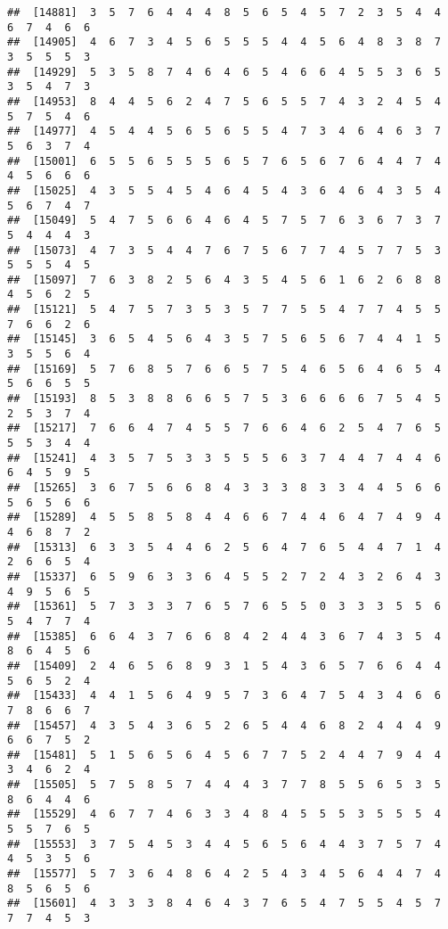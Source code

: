 \documentclass[
]{book}
\begin{document}
\begin{verbatim}
##  [14881]  3  5  7  6  4  4  4  8  5  6  5  4  5  7  2  3  5  4  4  6  7  4  6  6
##  [14905]  4  6  7  3  4  5  6  5  5  5  4  4  5  6  4  8  3  8  7  3  5  5  5  3
##  [14929]  5  3  5  8  7  4  6  4  6  5  4  6  6  4  5  5  3  6  5  3  5  4  7  3
##  [14953]  8  4  4  5  6  2  4  7  5  6  5  5  7  4  3  2  4  5  4  5  7  5  4  6
##  [14977]  4  5  4  4  5  6  5  6  5  5  4  7  3  4  6  4  6  3  7  5  6  3  7  4
##  [15001]  6  5  5  6  5  5  5  6  5  7  6  5  6  7  6  4  4  7  4  4  5  6  6  6
##  [15025]  4  3  5  5  4  5  4  6  4  5  4  3  6  4  6  4  3  5  4  5  6  7  4  7
##  [15049]  5  4  7  5  6  6  4  6  4  5  7  5  7  6  3  6  7  3  7  5  4  4  4  3
##  [15073]  4  7  3  5  4  4  7  6  7  5  6  7  7  4  5  7  7  5  3  5  5  5  4  5
##  [15097]  7  6  3  8  2  5  6  4  3  5  4  5  6  1  6  2  6  8  8  4  5  6  2  5
##  [15121]  5  4  7  5  7  3  5  3  5  7  7  5  5  4  7  7  4  5  5  7  6  6  2  6
##  [15145]  3  6  5  4  5  6  4  3  5  7  5  6  5  6  7  4  4  1  5  3  5  5  6  4
##  [15169]  5  7  6  8  5  7  6  6  5  7  5  4  6  5  6  4  6  5  4  5  6  6  5  5
##  [15193]  8  5  3  8  8  6  6  5  7  5  3  6  6  6  6  7  5  4  5  2  5  3  7  4
##  [15217]  7  6  6  4  7  4  5  5  7  6  6  4  6  2  5  4  7  6  5  5  5  3  4  4
##  [15241]  4  3  5  7  5  3  3  5  5  5  6  3  7  4  4  7  4  4  6  6  4  5  9  5
##  [15265]  3  6  7  5  6  6  8  4  3  3  3  8  3  3  4  4  5  6  6  5  6  5  6  6
##  [15289]  4  5  5  8  5  8  4  4  6  6  7  4  4  6  4  7  4  9  4  4  6  8  7  2
##  [15313]  6  3  3  5  4  4  6  2  5  6  4  7  6  5  4  4  7  1  4  2  6  6  5  4
##  [15337]  6  5  9  6  3  3  6  4  5  5  2  7  2  4  3  2  6  4  3  4  9  5  6  5
##  [15361]  5  7  3  3  3  7  6  5  7  6  5  5  0  3  3  3  5  5  6  5  4  7  7  4
##  [15385]  6  6  4  3  7  6  6  8  4  2  4  4  3  6  7  4  3  5  4  8  6  4  5  6
##  [15409]  2  4  6  5  6  8  9  3  1  5  4  3  6  5  7  6  6  4  4  5  6  5  2  4
##  [15433]  4  4  1  5  6  4  9  5  7  3  6  4  7  5  4  3  4  6  6  7  8  6  6  7
##  [15457]  4  3  5  4  3  6  5  2  6  5  4  4  6  8  2  4  4  4  9  6  6  7  5  2
##  [15481]  5  1  5  6  5  6  4  5  6  7  7  5  2  4  4  7  9  4  4  3  4  6  2  4
##  [15505]  5  7  5  8  5  7  4  4  4  3  7  7  8  5  5  6  5  3  5  8  6  4  4  6
##  [15529]  4  6  7  7  4  6  3  3  4  8  4  5  5  5  3  5  5  5  4  5  5  7  6  5
##  [15553]  3  7  5  4  5  3  4  4  5  6  5  6  4  4  3  7  5  7  4  4  5  3  5  6
##  [15577]  5  7  3  6  4  8  6  4  2  5  4  3  4  5  6  4  4  7  4  8  5  6  5  6
##  [15601]  4  3  3  3  8  4  6  4  3  7  6  5  4  7  5  5  4  5  7  7  7  4  5  3

\end{verbatim}
\end{document}
